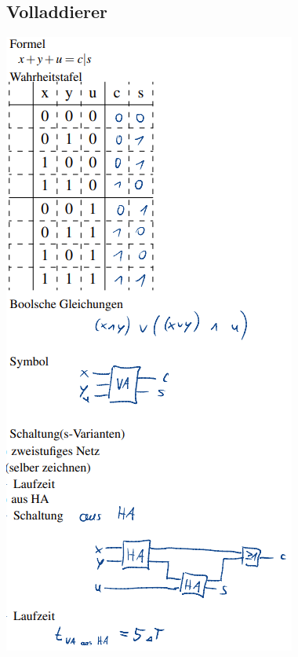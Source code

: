\documentclass[12pt,a4paper]{article}
\begin{document}
	\begin{minipage}[t]{0.5\textwidth}
		\subsection{Volladdierer}
		\includegraphics[width=\textwidth]{Bilder/volladdierer.PNG}
	\end{minipage}
\end{document}
